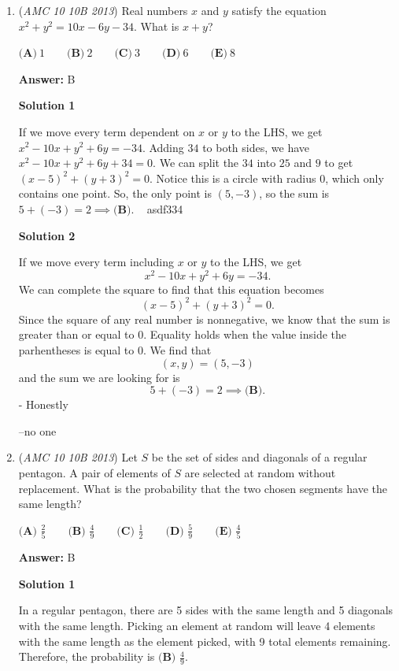 \begin{enumerate}
	\item (\textit{AMC 10 10B 2013}) Real numbers $x$ and $y$ satisfy the equation $x^2 + y^2 = 10x - 6y - 34$.  What is $x+y$?


 $\textbf{(A)}\ 1 \qquad\textbf{(B)}\ 2  \qquad\textbf{(C)}\ 3 \qquad\textbf{(D)}\ 6 \qquad\textbf{(E)}\ 8$

 \textbf{Answer: }B



\textbf{Solution 1}

If we move every term dependent on $x$ or $y$ to the LHS, we get $x^2 - 10x + y^2 + 6y = -34$. Adding $34$ to both sides, we have $x^2 - 10x + y^2 + 6y + 34 = 0$. We can split the $34$ into $25$ and $9$ to get $(x - 5)^2 + (y + 3)^2 = 0$. Notice this is a circle with radius $0$, which only contains one point. So, the only point is $(5, -3)$, so the sum is $5 + (-3) = 2 \implies \boxed{\textbf{(B)}}$. ~ asdf334

 



\textbf{Solution 2}

If we move every term including $x$ or $y$ to the LHS, we get 
 \[x^2 - 10x + y^2 + 6y = -34.\]  We can complete the square to find that this equation becomes 
 \[(x - 5)^2 + (y + 3)^2 = 0.\]  Since the square of any real number is nonnegative, we know that the sum is greater than or equal to $0$.  Equality holds when the value inside the parhentheses is equal to $0$.  We find that 
 \[(x,y) = (5,-3)\] and the sum we are looking for is 
 \[5+(-3)=2 \implies \boxed{\textbf{(B)}}.\]  - Honestly

 –no one

 


	\item (\textit{AMC 10 10B 2013}) Let $S$ be the set of sides and diagonals of a regular pentagon. A pair of elements of $S$ are selected at random without replacement. What is the probability that the two chosen segments have the same length?


 $\textbf{(A) }\frac{2}5\qquad\textbf{(B) }\frac{4}9\qquad\textbf{(C) }\frac{1}2\qquad\textbf{(D) }\frac{5}9\qquad\textbf{(E) }\frac{4}5$

 \textbf{Answer: }B



\textbf{Solution 1}

In a regular pentagon, there are 5 sides with the same length and 5 diagonals with the same length. Picking an element at random will leave 4 elements with the same length as the element picked, with 9 total elements remaining. Therefore, the probability is $\boxed{\textbf{(B) }\frac{4}{9}}$.


\end{enumerate}

